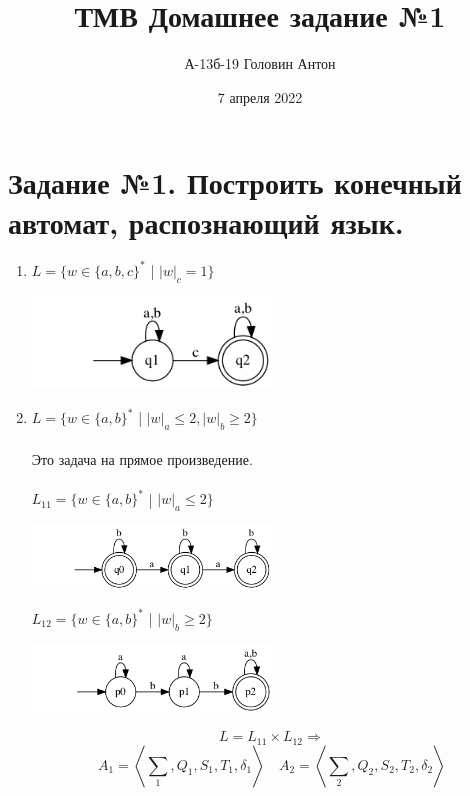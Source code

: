 \documentclass{article}
\title{ТМВ Домашнее задание №1}
\author{А-13б-19 Головин Антон}
\date{7 апреля 2022}
\begin{document}
\maketitle
\section{Задание №1. Построить конечный автомат, распознающий язык.}
\begin{enumerate}
\item {$L = \{ w \in \{a,b,c\}^*  $ | $  |w|_c = 1 \} $} \\
\begin{center}
    \includegraphics[width=0.5\textwidth]{g11.png}
\end{center}
\item {$L = \{ w \in \{a,b\}^*  $ | $  |w|_a \le 2, {|w|_b} \ge 2 \}$} \\ \\
Это задача на прямое произведение. \\ \\
$L_{11} = \{ w \in \{a,b\}^*  $ | $  |w|_a \le 2 \} $\\
\begin{center}
    \includegraphics[width=0.5\textwidth]{g121.png}
\end{center}

$L_{12} = \{ w \in \{a,b\}^*  $ | $  |w|_b \ge 2 \} $
\begin{center}
    \includegraphics[width=0.5\textwidth]{g122.png}
\end{center}

\newpage

\begin{center}
\[
    L = L_{11} \times L_{12} \Rightarrow \]
    \[A_1 = \left\langle \sum_{1} , Q_1, S_1, T_1, \delta_1\right\rangle \quad 
    A_2 = \left\langle \sum_{2}, Q_2, S_2, T_2, \delta_2\right\rangle
\]


\end{center}
\end{enumerate}
\end{document}
